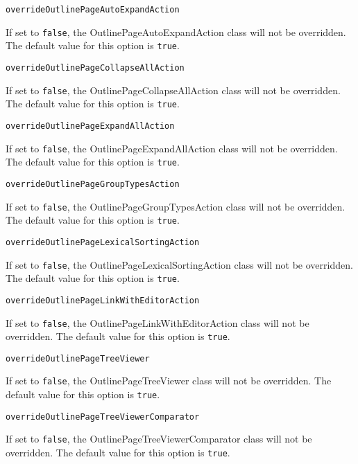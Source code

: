 \noindent\texttt{overrideOutlinePageAutoExpandAction}
\begin{myindentpar}{1cm}
If set to \texttt{false}, the OutlinePageAutoExpandAction class will not be overridden. The default value for this option is \texttt{true}.
\end{myindentpar}

\noindent\texttt{overrideOutlinePageCollapseAllAction}
\begin{myindentpar}{1cm}
If set to \texttt{false}, the OutlinePageCollapseAllAction class will not be overridden. The default value for this option is \texttt{true}.
\end{myindentpar}

\noindent\texttt{overrideOutlinePageExpandAllAction}
\begin{myindentpar}{1cm}
If set to \texttt{false}, the OutlinePageExpandAllAction class will not be overridden. The default value for this option is \texttt{true}.
\end{myindentpar}

\noindent\texttt{overrideOutlinePageGroupTypesAction}
\begin{myindentpar}{1cm}
If set to \texttt{false}, the OutlinePageGroupTypesAction class will not be overridden. The default value for this option is \texttt{true}.
\end{myindentpar}

\noindent\texttt{overrideOutlinePageLexicalSortingAction}
\begin{myindentpar}{1cm}
If set to \texttt{false}, the OutlinePageLexicalSortingAction class will not be overridden. The default value for this option is \texttt{true}.
\end{myindentpar}

\noindent\texttt{overrideOutlinePageLinkWithEditorAction}
\begin{myindentpar}{1cm}
If set to \texttt{false}, the OutlinePageLinkWithEditorAction class will not be overridden. The default value for this option is \texttt{true}.
\end{myindentpar}

\noindent\texttt{overrideOutlinePageTreeViewer}
\begin{myindentpar}{1cm}
If set to \texttt{false}, the OutlinePageTreeViewer class will not be overridden. The default value for this option is \texttt{true}.
\end{myindentpar}

\noindent\texttt{overrideOutlinePageTreeViewerComparator}
\begin{myindentpar}{1cm}
If set to \texttt{false}, the OutlinePageTreeViewerComparator class will not be overridden. The default value for this option is \texttt{true}.
\end{myindentpar}

